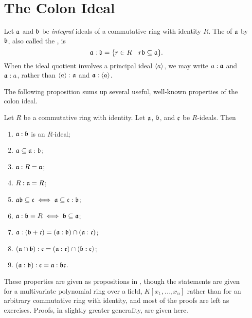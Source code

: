 \section{The Colon Ideal}
\label{appendix_colon_ideal}

Let $\frak a$ and $\frak b$ be \emph{integral} ideals of a commutative ring with identity $R$.
The  of $\frak a$ by $\frak b$, also called the , is
\[ \frak a : \frak b = \{ r \in R ~|~ r \frak b \subseteq \frak a \}. \]
When the ideal quotient involves a principal ideal $\left\langle a \right\rangle$, we may write $a : \frak a$ and $\frak a : a$,
rather than $\left\langle a \right\rangle : \frak a$ and $\frak a : \left\langle a \right\rangle$.

The following proposition sums up several useful, well-known properties of the colon ideal.
\begin{proposition}
  \label{prop_colon_ideal}
  Let $R$ be a commutative ring with identity.
  Let $\frak a$, $\frak b$, and $\frak c$ be $R$-ideals. Then
  \begin{enumerate}[label=(\roman*)]
    \item $\frak a : \frak b$ is an $R$-ideal;
    \item $\frak a \subseteq \frak a : \frak b$;
    \item $\frak a : R = \frak a$;
    \item $R : \frak a = R$;
    \item $\frak a \frak b \subseteq \frak c \iff \frak a \subseteq \frak c : \frak b$;
    \item $\frak a : \frak b = R \iff \frak b \subseteq \frak a$;
    \item $\frak a : (\frak b + \frak c) = (\frak a : \frak b) \cap (\frak a : \frak c)$;
    \item $(\frak a \cap \frak b) : \frak c = (\frak a : \frak c) \cap (\frak b : \frak c)$;
    \item $(\frak a : \frak b) : \frak c = \frak a : \frak b \frak c$.
  \end{enumerate}
\end{proposition}

These properties are given as propositions in \cite{cox07},
though the statements are given for a multivariate polynomial ring over a field, $K[x_1, \ldots, x_n]$
rather than for an arbitrary commutative ring with identity,
and most of the proofs are left as exercises.
Proofs, in slightly greater generality, are given here.

